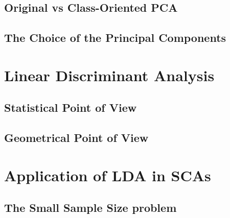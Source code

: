 \subsection{Original vs Class-Oriented PCA}
\subsection{The Choice of the Principal Components}


\section{Linear Discriminant Analysis}
\subsection{Statistical Point of View}
\subsection{Geometrical Point of View}


\section{Application of LDA in SCAs}
\subsection{The Small Sample Size problem}